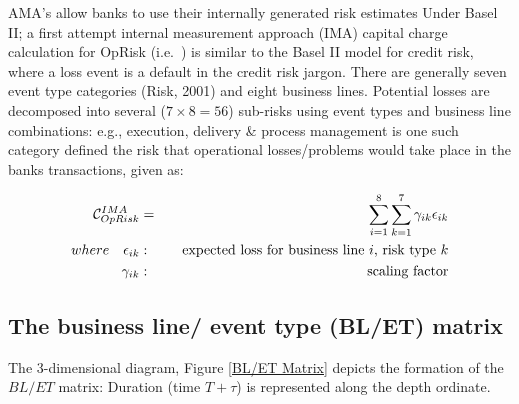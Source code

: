 \documentclass{DissertateUSU}
\begin{document}
AMA's allow banks to use their internally generated risk estimates Under
Basel II; a first attempt internal measurement approach (IMA) capital
charge calculation for OpRisk (i.e.~) is similar to the Basel II model
for credit risk, where a loss event is a default in the credit risk
jargon. There are generally seven event type categories (Risk, 2001) and
eight business lines. Potential losses are decomposed into several
(\(7 \times 8 = 56\)) sub-risks using event types and business line
combinations: e.g., execution, delivery \& process management is one
such category defined the risk that operational losses/problems would
take place in the banks transactions, given as:

\begin{eqnarray}
\mathcal{\Large{C}}_{OpRisk}^{IMA} &=& \sum_{i=1}^8 \sum_{k=1}^7 \gamma_{ik}\epsilon_{ik} \\
where \quad \epsilon_{ik}&:& \quad \mbox{expected loss for business line $i$, risk type $k$} \nonumber \\
      \gamma_{ik}&:& \quad \mbox{scaling factor} \nonumber
\end{eqnarray}

\subsection{The business line/ event type (BL/ET) matrix}

The 3-dimensional diagram, Figure \ref{BL/ET Matrix} depicts the
formation of the \(BL/ET\) matrix: Duration (time \(T+\tau\)) is
represented along the depth ordinate.
\end{document}
